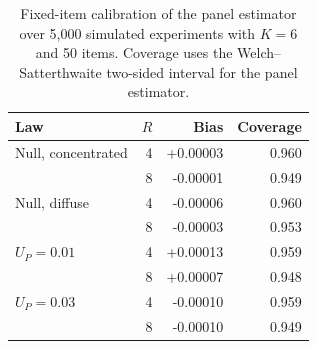 \begin{table}[t]
\centering
\small
\begin{tabular}{lrrr}
\toprule
Law & $R$ & Bias & Coverage \\
\midrule
Null, concentrated & 4 & +0.00003 & 0.960 \\
 & 8 & -0.00001 & 0.949 \\
Null, diffuse & 4 & -0.00006 & 0.960 \\
 & 8 & -0.00003 & 0.953 \\
$U_P=0.01$ & 4 & +0.00013 & 0.959 \\
 & 8 & +0.00007 & 0.948 \\
$U_P=0.03$ & 4 & -0.00010 & 0.959 \\
 & 8 & -0.00010 & 0.949 \\
\bottomrule
\end{tabular}
\caption{Fixed-item calibration of the panel estimator over 5,000
simulated experiments with $K=6$ and 50 items. Coverage uses the
Welch--Satterthwaite two-sided interval for the panel estimator.}
\label{tab:panel_calibration}
\end{table}
